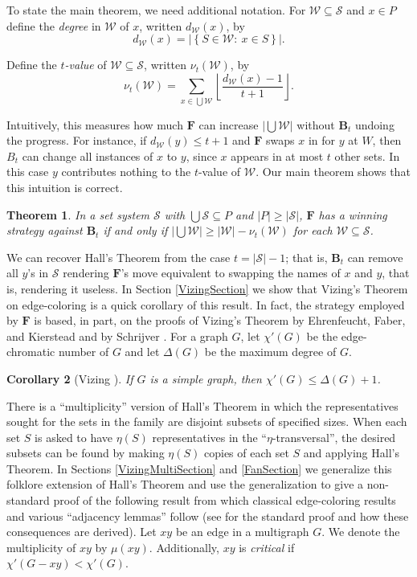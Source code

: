 \documentclass[12pt]{amsart}
\theoremstyle{plain}
\newtheorem{thm}{Theorem}[section]
\newtheorem{cor}[thm]{Corollary}
\theoremstyle{definition}
\theoremstyle{remark}
\newcommand{\fancy}[1]{\mathcal{#1}}
\newcommand{\setbcolon}[3]{\left\{ #1 \in #2 \colon\ #3 \right\}}
\newcommand{\card}[1]{\left|#1\right|}
\newcommand{\floor}[1]{\left\lfloor#1\right\rfloor}
\renewcommand{\S}{\fancy{S}}
\newcommand{\W}{\fancy{W}}
\newcommand{\F}{\mathbf{F}}
\newcommand{\B}{\mathbf{B}}
\begin{document}
To state the main theorem, we need additional notation.
For $\W \subseteq \S$ and $x \in P$ define the \emph{degree} in $\W$ of $x$, written $d_{\W}(x)$, by
\[d_{\W}(x) = \card{\setbcolon{S}{\W}{x \in S}}.\]

\noindent Define the \emph{$t$-value} of $\W \subseteq \S$, written $\nu_t(\W)$, by
\[\nu_t(\W) = \sum_{x \in \bigcup \W} \floor{\frac{d_{\W}(x) - 1}{t + 1}}.\]

Intuitively, this measures how much $\F$ can increase $\card{\bigcup \W}$ without $\B_t$ undoing the progress. For instance, if $d_{\W}(y) \leq t + 1$ and $\F$ swaps $x$ in for $y$ at $W$, then $B_t$ can change all instances of $x$ to $y$, since $x$ appears in at most $t$ other sets.  In this case $y$ contributes nothing to the $t$-value of $\W$.  Our main theorem shows that this intuition is correct.

\begin{thm}\label{MainTheorem}
In a set system $\S$ with $\bigcup \S \subseteq P$ and $\card{P} \ge \card{\S}$, $\F$ has a winning strategy against $\B_t$ if and only if $\card{\bigcup \W} \geq \card{\W} - \nu_t(\W)$ for each $\W \subseteq \S$.
\end{thm}

We can recover Hall's Theorem from the case $t = \card{\S} - 1$; that is, $\B_t$
can remove all $y$'s in $\S$ rendering $\F$'s move equivalent to swapping the
names of $x$ and $y$, that is, rendering it useless. In Section
\ref{VizingSection} we show that Vizing's Theorem on edge-coloring is a quick corollary of this result.  
In fact, the strategy employed by $\F$ is based, in part, on the proofs of Vizing's Theorem by Ehrenfeucht, Faber, and Kierstead \cite{Ehrenfeucht1984159} and by Schrijver \cite{schrijver}.
For a graph $G$, let $\chi'(G)$ be the edge-chromatic number of $G$ and let $\Delta(G)$ be the maximum degree of $G$.

\begin{cor}[Vizing \cite{vizing}]\label{VizingSimple}
If $G$ is a simple graph, then $\chi'(G) \le \Delta(G)+1$.
\end{cor}

There is a ``multiplicity'' version of Hall's Theorem in which the representatives sought for the sets in the family are disjoint subsets of specified sizes.  When each set $S$ is asked to have $\eta(S)$ representatives in the ``$\eta$-transversal'', the desired subsets can be found by making $\eta(S)$ copies of each set $S$ and applying Hall's Theorem. In Sections \ref{VizingMultiSection} and \ref{FanSection} we generalize this folklore extension of Hall's Theorem and use the generalization to give a non-standard proof of the following result from which classical edge-coloring results and various ``adjacency lemmas'' follow (see \cite{stiebitz} for the standard proof and how these consequences are derived).  Let $xy$ be an edge in a multigraph $G$.  We denote the multiplicity of $xy$ by $\mu(xy)$.  Additionally, $xy$ is \emph{critical} if $\chi'(G-xy) < \chi'(G)$.
\end{document}
